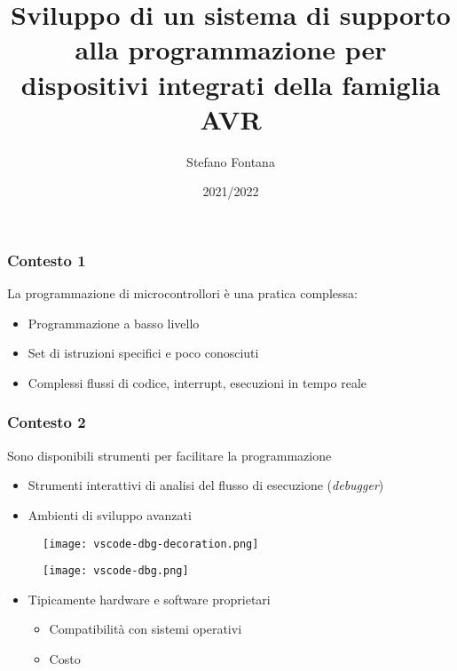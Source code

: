 \documentclass[aspectratio=169,
]{beamer}
\title[Relazione Finale]{Sviluppo di un sistema di supporto alla programmazione per dispositivi integrati della famiglia AVR}
\author[S.Fontana --- 727199]{Stefano Fontana}
\date{2021/2022}
\begin{document}
    \maketitle

    \begin{frame}
        \frametitle{Contesto \hfill 1}
    
        La programmazione di microcontrollori è una pratica complessa:

        \begin{itemize}
            \item <1-> Programmazione a basso livello
            \item <2-> Set di istruzioni specifici e poco conosciuti
            \item <3-> Complessi flussi di codice, interrupt, esecuzioni in tempo reale
        \end{itemize}

        
    \end{frame}

    \begin{frame}
        \frametitle{Contesto \hfill 2}
    
        Sono disponibili strumenti per facilitare la programmazione
        \begin{itemize}
            \item <1-> Strumenti interattivi di analisi del flusso di esecuzione (\textit{debugger})
            \item <2-> Ambienti di sviluppo avanzati
        \end{itemize}

        \begin{figure}
            \hfill
            \begin{minipage}{.45\textwidth}
                \texttt{[image: vscode-dbg-decoration.png]}
            \end{minipage}
            \hfill
            \begin{minipage}{.45\textwidth}
                \texttt{[image: vscode-dbg.png]}
            \end{minipage}
        \end{figure}

        \begin{itemize}
            \item <3-> Tipicamente hardware e software proprietari
            \begin{itemize}
                \item <4-> Compatibilità con sistemi operativi
                \item <5-> Costo
            \end{itemize}
        \end{itemize}
    \end{frame}
\end{document}

